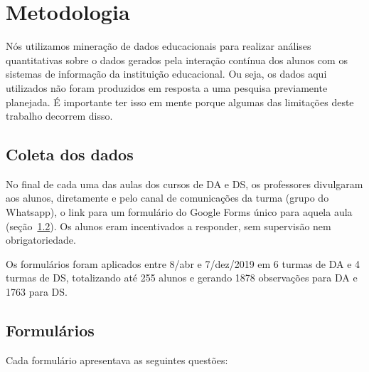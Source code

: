 \section{Metodologia}
\label{sec:metodologia}

Nós utilizamos mineração de dados educacionais \cite{Baker2011} para realizar análises quantitativas sobre o dados gerados pela interação contínua dos alunos com os sistemas de informação da instituição educacional.
Ou seja, os dados aqui utilizados não foram produzidos em resposta a uma pesquisa previamente planejada.
É importante ter isso em mente porque algumas das limitações deste trabalho decorrem disso.


\subsection{Coleta dos dados}

No final de cada uma das aulas dos cursos de DA e DS, os professores divulgaram aos alunos, diretamente e pelo canal de comunicações da turma (grupo do Whatsapp), o link para um formulário do Google Forms único para aquela aula (seção~\ref{sec:formularios}).
Os alunos eram incentivados a responder, sem supervisão nem obrigatoriedade.

Os formulários foram aplicados entre 8/abr e 7/dez/2019 em 6 turmas de DA e 4 turmas de DS, totalizando até 255 alunos e gerando 1878 observações para DA e 1763 para DS.

\subsection{Formulários}
\label{sec:formularios}

Cada formulário apresentava as seguintes questões:

